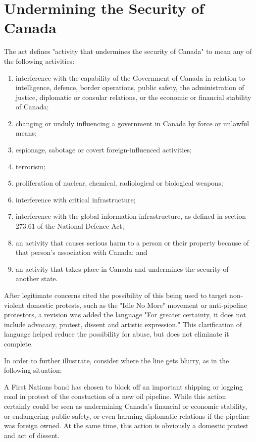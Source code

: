 \documentclass[a4paper, 11pt]{article} %
\begin{document}

\section*{Undermining the Security of Canada}
The act defines "activity that undermines the security of Canada" to mean any of the following activities:

\begin{enumerate}
    \item interference with the capability of the Government of Canada in relation to intelligence, defence, border operations, public safety, the administration of justice, diplomatic or consular relations, or the economic or financial stability of Canada;
    \item changing or unduly influencing a government in Canada by force or unlawful means;
    \item espionage, sabotage or covert foreign-influenced activities;
    \item terrorism;
    \item proliferation of nuclear, chemical, radiological or biological weapons;
    \item interference with critical infrastructure;
    \item interference with the global information infrastructure, as defined in section 273.61 of the National Defence Act;
    \item an activity that causes serious harm to a person or their property because of that person's association with Canada; and
    \item an activity that takes place in Canada and undermines the security of another state.
\end{enumerate}

After legitimate concerns cited the possibility of this being used to target non-violent domestic protests, such as the "Idle No More" movement or anti-pipeline protestors, a revision was added the language "For greater certainty, it does not include advocacy, protest, dissent and artistic expression." This clarification of language helped reduce the possibility for abuse, but does not eliminate it complete.

In order to further illustrate, consider where the line gets blurry, as in the following situation:

\begin{displayquote}
A First Nations band has chosen to block off an important shipping or logging road in protest of the constuction of a new oil pipeline. While this action certainly could be seen as undermining Canada's financial or economic stability, or endangering public safety, or even harming diplomatic relations if the pipeline was foreign owned. At the same time, this action is obviously a domestic protest and act of dissent.
\end{displayquote}
\end{document}
